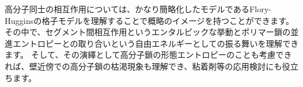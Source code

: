 \documentclass[a4paper,11pt]{jlreq}
\begin{document}
高分子同士の相互作用については、かなり簡略化したモデルであるFlory-Hugginsの格子モデルを理解することで概略のイメージを持つことができます。
その中で、セグメント間相互作用というエンタルピックな挙動とポリマー鎖の並進エントロピーとの取り合いという自由エネルギーとしての振る舞いを理解できます。
そして、その演繹として高分子鎖の形態エントロピーのことも考慮できれば、壁近傍での高分子鎖の枯渇現象も理解でき、粘着剤等の応用検討にも役立ちます。



\end{document}
